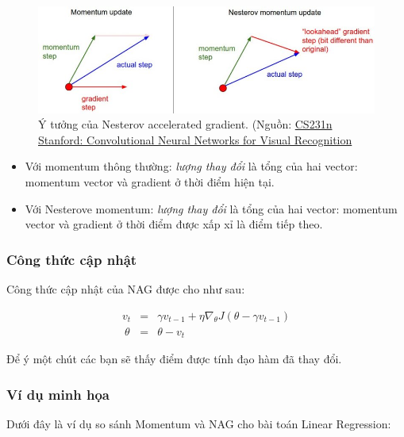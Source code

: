  \begin{figure}
   \centering
   \includegraphics[width = \textwidth]{../GD/nesterov.jpeg}
   \caption{Ý tưởng của Nesterov accelerated gradient. (Nguồn: \href{href="http://cs231n.github.io/neural-networks-3/}{CS231n Stanford: Convolutional Neural Networks for Visual Recognition}}
   \label{fig:}
 \end{figure}

\begin{itemize}
    \item Với momentum thông thường: \textit{lượng thay đổi} là tổng của hai vector: momentum vector và gradient ở thời điểm hiện tại. 

    \item Với Nesterove momentum: \textit{lượng thay đổi} là tổng của hai vector: momentum vector và gradient ở thời điểm được xấp xỉ là điểm tiếp theo.  
\end{itemize}
 
 
\subsubsection{Công thức cập nhật}
 
Công thức cập nhật của NAG được cho như sau: 
 
\begin{eqnarray*} 
v_{t} &=& \gamma v_{t-1} + \eta \nabla_{\theta}J(\theta - \gamma v_{t-1}) \\\ 
\theta &=& \theta -  v_{t} 
\end{eqnarray*} 
 
Để ý một chút các bạn sẽ thấy điểm được tính đạo hàm đã thay đổi.  
 
 
\subsubsection{Ví dụ minh họa }
 
Dưới đây là ví dụ so sánh Momentum và NAG cho bài toán Linear Regression: 
 
 
